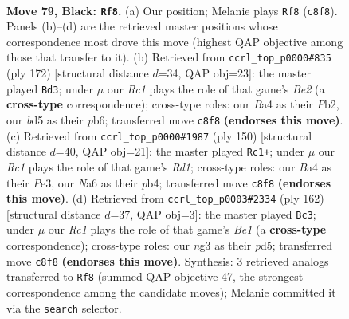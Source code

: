 \documentclass[11pt]{article}
\begin{document}
\clearpage

\begin{figure}[p]\centering
\begin{subfigure}{0.46\textwidth}\centering
\resizebox{\linewidth}{!}{%
\newchessgame
\chessboard[
  setfen={2r5/5p2/n5p1/3BP2p/b4Pp1/3k2N1/6KP/8 b - - 17 79},
  showmover=false,
  pgfstyle=straightmove, color=movearrow, markmove={c8-f8}
]}
\caption{}
\end{subfigure}\hfill
\begin{subfigure}{0.46\textwidth}\centering
\resizebox{\linewidth}{!}{%
\newchessgame
\chessboard[
  setfen={8/6k1/1p2pb2/p2p4/3P1P2/P3P1K1/1P2B3/8 w - - 53 87},
  showmover=false,
  pgfstyle=straightmove, color=movearrow, markmove={e2-d3}
]}
\caption{}
\end{subfigure}
\\[4pt]
\begin{subfigure}{0.46\textwidth}\centering
\resizebox{\linewidth}{!}{%
\newchessgame
\chessboard[
  setfen={8/8/5b2/p1kb3p/Pp3P2/1P1KP1P1/8/3R4 w - - 3 76},
  showmover=false,
  pgfstyle=straightmove, color=movearrow, markmove={d1-c1}
]}
\caption{}
\end{subfigure}\hfill
\begin{subfigure}{0.46\textwidth}\centering
\resizebox{\linewidth}{!}{%
\newchessgame
\chessboard[
  setfen={8/1p3bK1/p3k3/P2pP3/1P1P4/8/8/4B3 w - - 45 82},
  showmover=false,
  pgfstyle=straightmove, color=movearrow, markmove={e1-c3}
]}
\caption{}
\end{subfigure}
\caption{\textbf{Move 79, Black: \texttt{Rf8}.} (a) Our position; Melanie plays \texttt{Rf8} (\texttt{c8f8}). Panels (b)--(d) are the retrieved master positions whose correspondence most drove this move (highest QAP objective among those that transfer to it). (b) Retrieved from \texttt{ccrl\_top\_p0000\#835} (ply 172) [structural distance $d$=34, QAP obj=23]: the master played \texttt{Bd3}; under $\mu$ our \emph{Rc1} plays the role of that game's \emph{Be2} (a \textbf{cross-type} correspondence); cross-type roles: our \emph{B}a4 as their \emph{P}b2, our \emph{b}d5 as their \emph{p}b6; transferred move \texttt{c8f8} \textbf{(endorses this move)}. (c) Retrieved from \texttt{ccrl\_top\_p0000\#1987} (ply 150) [structural distance $d$=40, QAP obj=21]: the master played \texttt{Rc1+}; under $\mu$ our \emph{Rc1} plays the role of that game's \emph{Rd1}; cross-type roles: our \emph{B}a4 as their \emph{P}e3, our \emph{N}a6 as their \emph{p}b4; transferred move \texttt{c8f8} \textbf{(endorses this move)}. (d) Retrieved from \texttt{ccrl\_top\_p0003\#2334} (ply 162) [structural distance $d$=37, QAP obj=3]: the master played \texttt{Bc3}; under $\mu$ our \emph{Rc1} plays the role of that game's \emph{Be1} (a \textbf{cross-type} correspondence); cross-type roles: our \emph{n}g3 as their \emph{p}d5; transferred move \texttt{c8f8} \textbf{(endorses this move)}. Synthesis: 3 retrieved analogs transferred to \texttt{Rf8} (summed QAP objective 47, the strongest correspondence among the candidate moves); Melanie committed it via the \texttt{search} selector.}
\label{fig:thought-m157}
\end{figure}
\end{document}
